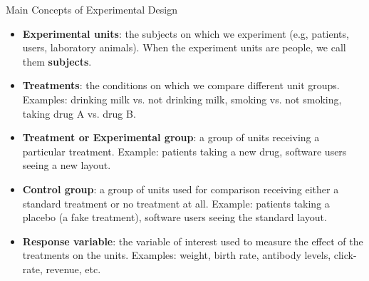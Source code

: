 \documentclass[handout]{beamer}
\begin{document}
\begin{frame}{Main Concepts of Experimental Design}
\scriptsize{


\begin{itemize}
 \item \textbf{Experimental units}: the subjects on which we experiment (e.g, patients, users, laboratory animals). When the experiment units are people, we call them  \textbf{subjects}.
 \item \textbf{Treatments}: the conditions on which we compare different unit groups. Examples: drinking milk vs. not drinking milk, smoking vs. not smoking, taking drug A vs. drug B.
 \item \textbf{Treatment or Experimental group}: a group of units receiving a particular treatment. Example: patients taking a new drug, software users seeing a new layout.
 \item \textbf{Control group}: a group of units used for comparison receiving either a standard treatment or no treatment at all. Example: patients taking a placebo (a fake treatment), software users seeing the standard layout.
 
  \item \textbf{Response variable}: the variable of interest used to measure the effect of the treatments on the units. Examples: weight, birth rate, antibody levels, click-rate, revenue, etc.
 
\end{itemize}



} 
\end{frame}
\end{document}

